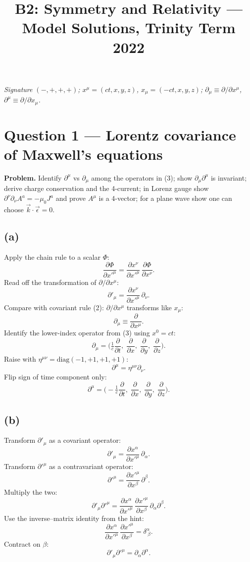 \documentclass[11pt]{article}
\title{B2: Symmetry and Relativity --- Model Solutions, Trinity Term 2022}
\author{}
\date{}
\newcommand{\pd}[2]{\frac{\partial #1}{\partial #2}}
\begin{document}
\maketitle

\noindent\textit{Signature $(-,+,+,+)$; $x^{\mu}=(ct,x,y,z)$, $x_{\mu}=(-ct,x,y,z)$; $\partial_{\mu}\equiv\partial/\partial x^{\mu}$, $\partial^{\mu}\equiv\partial/\partial x_{\mu}$.}

\section*{Question 1 --- Lorentz covariance of Maxwell's equations}

\textbf{Problem.} Identify $\partial^{\mu}$ vs $\partial_{\mu}$ among the operators in (3); show $\partial_{\mu}\partial^{\mu}$ is invariant; derive charge conservation and the 4-current; in Lorenz gauge show $\partial^{\nu}\partial_{\nu}A^{a}=-\mu_{0}J^{a}$ and prove $A^{\mu}$ is a 4-vector; for a plane wave show one can choose $\vec{k}\cdot\vec{\epsilon}=0$.

\subsection*{(a)}
Apply the chain rule to a scalar $\Phi$:
\[ \pd{\Phi}{x'^{\mu}}=\pd{x^{\nu}}{x'^{\mu}}\,\pd{\Phi}{x^{\nu}}. \]
Read off the transformation of $\partial/\partial x^{\mu}$:
\[ \partial'_{\mu}=\pd{x^{\nu}}{x'^{\mu}}\,\partial_{\nu}. \]
Compare with covariant rule (2): $\partial/\partial x^{\mu}$ transforms like $x_{\mu}$:
\[ \partial_{\mu}\equiv\pd{}{x^{\mu}}. \]
Identify the lower-index operator from (3) using $x^{0}=ct$:
\[ \boxed{\;\partial_{\mu}=\Big(\tfrac{1}{c}\pd{}{t},\;\pd{}{x},\;\pd{}{y},\;\pd{}{z}\Big).\;} \]
Raise with $\eta^{\mu\nu}=\mathrm{diag}(-1,+1,+1,+1)$:
\[ \partial^{\mu}=\eta^{\mu\nu}\partial_{\nu}. \]
Flip sign of time component only:
\[ \boxed{\;\partial^{\mu}=\Big(-\tfrac{1}{c}\pd{}{t},\;\pd{}{x},\;\pd{}{y},\;\pd{}{z}\Big).\;} \]

\subsection*{(b)}
Transform $\partial'_{\mu}$ as a covariant operator:
\[ \partial'_{\mu}=\pd{x^{\alpha}}{x'^{\mu}}\,\partial_{\alpha}. \]
Transform $\partial'^{\mu}$ as a contravariant operator:
\[ \partial'^{\mu}=\pd{x'^{\mu}}{x^{\beta}}\,\partial^{\beta}. \]
Multiply the two:
\[ \partial'_{\mu}\partial'^{\mu}=\pd{x^{\alpha}}{x'^{\mu}}\,\pd{x'^{\mu}}{x^{\beta}}\,\partial_{\alpha}\partial^{\beta}. \]
Use the inverse--matrix identity from the hint:
\[ \pd{x^{\alpha}}{x'^{\mu}}\,\pd{x'^{\mu}}{x^{\beta}}=\delta^{\alpha}_{\;\beta}. \]
Contract on $\beta$:
\[ \boxed{\;\partial'_{\mu}\partial'^{\mu}=\partial_{\alpha}\partial^{\alpha}.\;} \]
\end{document}
